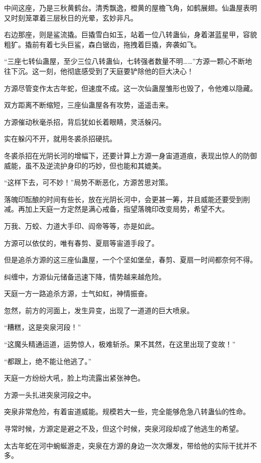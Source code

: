 \begin{this_body}
中间这座，乃是三秋黄鹤台。清秀飘逸，橙黄的屋檐飞角，如鹤展翅。仙蛊屋表明又时刻笼罩着三层秋日的光晕，玄妙非凡。

右边那座，则是鲨流撬。巨撬雪白如玉，站着一位八转蛊仙，身着湛蓝星甲，容貌粗犷。撬前有着七头巨鲨，森白锯齿，拖拽着巨撬，奔袭如飞。

“三座七转仙蛊屋，至少三位八转蛊仙，七转强者数量不明……”方源一颗心不断地往下沉。这一刻，他彻底感受到了天庭要铲除他的巨大决心！

方源尽管变作太古年蛇，但速度不成。这一次仙蛊屋雏形也毁了，令他难以隐藏。

双方距离不断缩短，三座仙蛊屋各有攻势，遥遥击来。

方源催动秋毫杀招，背后犹如长着眼睛，灵活躲闪。

实在躲闪不开，就用冬裘杀招硬抗。

冬裘杀招在光阴长河的增幅下，还要计算上方源一身宙道道痕，表现出惊人的防御威能，虽不及逆流护身印的巧妙，但也能和其媲美。

“这样下去，可不妙！”局势不断恶化，方源苦思对策。

落魄印酝酿的时间有些长，放在光阴长河中，会更甚一筹，并且威能还要受到削减。再加上天庭一方定然是满心戒备，指望落魄印改变局势，希望不大。

万我、万蛟、力道大手印、阎帝等等，亦是如此。

方源可以依仗的，唯有春剪、夏扇等宙道手段了。

但是追杀方源的这三座仙蛊屋，一个个坚如堡垒，春剪、夏扇一时间都奈何不得。

纠缠中，方源仙元储备迅速下降，情势越来越危险。

天庭一方一路追杀方源，士气如虹，神情振奋。

忽然，前方的河面上，发生异变，出现了一道道的巨大喷泉。

“糟糕，这是突泉河段！”

“这魔头精通运道，运势惊人，极难斩杀。果不其然，在这里出现了变故！”

“都跟上，绝不能让他逃了。”

天庭一方纷纷大吼，脸上均流露出紧张神色。

方源一头扎进突泉河段之中。

突泉非常危险，有着宙道威能。规模若大一些，完全能够危急八转蛊仙的性命。

寻常时候，方源定是避之不及，但这个时候，突泉河段却成了他逃生的希望。

太古年蛇在河中蜿蜒游走，突泉在方源的身边一次次爆发，带给他的实际干扰并不多。


\end{this_body}
